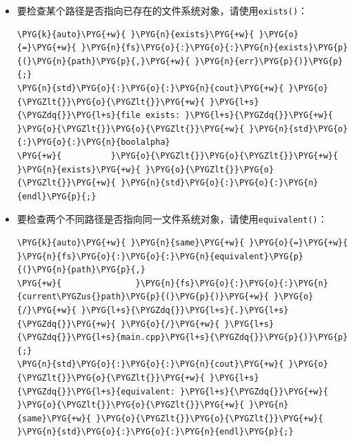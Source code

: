 \begin{itemize}
\item 要检查某个路径是否指向已存在的文件系统对象，请使用\texttt{exists()}：



\begin{codeblockbg}
\begin{Verbatim}[commandchars=\\\{\},breaklines=true,breakanywhere=true,fontsize=\codefont,xleftmargin=17bp]
\PYG{k}{auto}\PYG{+w}{ }\PYG{n}{exists}\PYG{+w}{ }\PYG{o}{=}\PYG{+w}{ }\PYG{n}{fs}\PYG{o}{:}\PYG{o}{:}\PYG{n}{exists}\PYG{p}{(}\PYG{n}{path}\PYG{p}{,}\PYG{+w}{ }\PYG{n}{err}\PYG{p}{)}\PYG{p}{;}
\PYG{n}{std}\PYG{o}{:}\PYG{o}{:}\PYG{n}{cout}\PYG{+w}{ }\PYG{o}{\PYGZlt{}}\PYG{o}{\PYGZlt{}}\PYG{+w}{ }\PYG{l+s}{\PYGZdq{}}\PYG{l+s}{file exists: }\PYG{l+s}{\PYGZdq{}}\PYG{+w}{ }\PYG{o}{\PYGZlt{}}\PYG{o}{\PYGZlt{}}\PYG{+w}{ }\PYG{n}{std}\PYG{o}{:}\PYG{o}{:}\PYG{n}{boolalpha}
\PYG{+w}{          }\PYG{o}{\PYGZlt{}}\PYG{o}{\PYGZlt{}}\PYG{+w}{ }\PYG{n}{exists}\PYG{+w}{ }\PYG{o}{\PYGZlt{}}\PYG{o}{\PYGZlt{}}\PYG{+w}{ }\PYG{n}{std}\PYG{o}{:}\PYG{o}{:}\PYG{n}{endl}\PYG{p}{;}
\end{Verbatim}
\end{codeblockbg}



\item 要检查两个不同路径是否指向同一文件系统对象，请使用\texttt{equivalent()}：



\begin{codeblockbg}
\begin{Verbatim}[commandchars=\\\{\},breaklines=true,breakanywhere=true,fontsize=\codefont,xleftmargin=17bp]
\PYG{k}{auto}\PYG{+w}{ }\PYG{n}{same}\PYG{+w}{ }\PYG{o}{=}\PYG{+w}{ }\PYG{n}{fs}\PYG{o}{:}\PYG{o}{:}\PYG{n}{equivalent}\PYG{p}{(}\PYG{n}{path}\PYG{p}{,}
\PYG{+w}{               }\PYG{n}{fs}\PYG{o}{:}\PYG{o}{:}\PYG{n}{current\PYGZus{}path}\PYG{p}{(}\PYG{p}{)}\PYG{+w}{ }\PYG{o}{/}\PYG{+w}{ }\PYG{l+s}{\PYGZdq{}}\PYG{l+s}{.}\PYG{l+s}{\PYGZdq{}}\PYG{+w}{ }\PYG{o}{/}\PYG{+w}{ }\PYG{l+s}{\PYGZdq{}}\PYG{l+s}{main.cpp}\PYG{l+s}{\PYGZdq{}}\PYG{p}{)}\PYG{p}{;}
\PYG{n}{std}\PYG{o}{:}\PYG{o}{:}\PYG{n}{cout}\PYG{+w}{ }\PYG{o}{\PYGZlt{}}\PYG{o}{\PYGZlt{}}\PYG{+w}{ }\PYG{l+s}{\PYGZdq{}}\PYG{l+s}{equivalent: }\PYG{l+s}{\PYGZdq{}}\PYG{+w}{ }\PYG{o}{\PYGZlt{}}\PYG{o}{\PYGZlt{}}\PYG{+w}{ }\PYG{n}{same}\PYG{+w}{ }\PYG{o}{\PYGZlt{}}\PYG{o}{\PYGZlt{}}\PYG{+w}{ }\PYG{n}{std}\PYG{o}{:}\PYG{o}{:}\PYG{n}{endl}\PYG{p}{;}
\end{Verbatim}
\end{codeblockbg}



\end{itemize}
